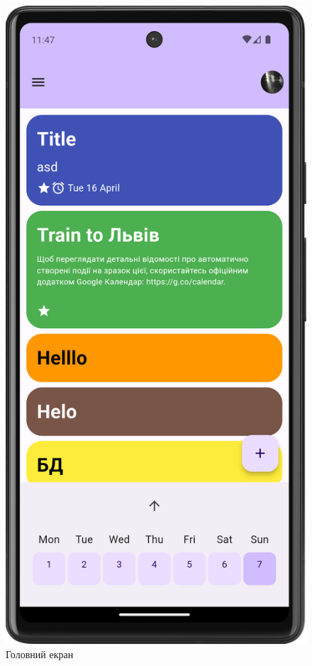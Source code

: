 \documentclass[oneside,14pt]{extarticle}
\begin{document}
\begin{normalsize}
	\begin{figure}[H]
		\begin{minipage}{0.48\textwidth}
			\centering
			\includegraphics[scale=0.12]{1}
			\caption{Головний екран}
		\end{minipage}\hfill

\end{figure}
\end{normalsize}
\end{document}
